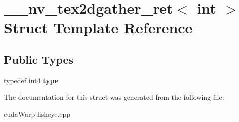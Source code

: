 \hypertarget{struct____nv__tex2dgather__ret_3_01int_01_4}{}\section{\+\_\+\+\_\+nv\+\_\+tex2dgather\+\_\+ret$<$ int $>$ Struct Template Reference}
\label{struct____nv__tex2dgather__ret_3_01int_01_4}
\subsection*{Public Types}
\begin{DoxyCompactItemize}
\item 
typedef int4 {\bfseries type}\hypertarget{struct____nv__tex2dgather__ret_3_01int_01_4_a997eb14214403115ac45924933b827fd}{}\label{struct____nv__tex2dgather__ret_3_01int_01_4_a997eb14214403115ac45924933b827fd}

\end{DoxyCompactItemize}


The documentation for this struct was generated from the following file\+:\begin{DoxyCompactItemize}
\item 
cuda\+Warp-\/fisheye.\+cpp\end{DoxyCompactItemize}
